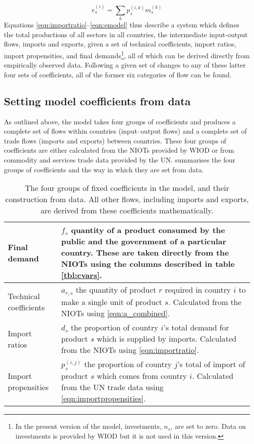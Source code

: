\documentclass[a4paper]{article}
\begin{document}
\begin{equation}\label{eqn:emodel}
e_s^{(i)} = \sum_k{p_s^{(i,k)}m_s^{(k)}}
\end{equation}
Equations \eqref{eqn:importratio}--\eqref{eqn:emodel} thus describe a system which defines the total productions of all sectors in all countries, the intermediate input-output flows, imports and exports, given a set of technical coefficients, import ratios, import propensities, and final demands\footnote{In the present version of the model, investments, $n_s$, are set to zero. 
Data on investments is provided by WIOD but it is not used in this version.}, all of which can be derived directly from empirically observed data.
Following a given set of changes to any of these latter four sets of coefficients, all of the former six categories of flow can be found.

\subsection{Setting model coefficients from data}
As outlined above, the model takes four groups of coefficients and produces a complete set of flows within countries (input--output flows) and a complete set of trade flows (imports and exports) between countries.
These four groups of coefficients are either calculated from the NIOTs provided by WIOD or from commodity and services trade data provided by the UN.
 summarises the four groups of coefficients and the way in which they are set from data.
\begin{table}
    \centering
    \caption{The four groups of fixed coefficients in the model, and their construction from data.
    All other flows, including imports and exports, are derived from these coefficients  mathematically.}
    \label{tbl:the_four_things}
    \begin{tabular}{lp{8cm}}
        \toprule
    Final demand &  $f_s$ quantity of a product consumed by the public and the government of a
    particular country.
    These are taken directly from the NIOTs using the columns described in table \ref{tbl:cvars}. \\
    \midrule
    Technical coefficients &  $a_{r,s}$ the quantity of product $r$ required in country $i$
    to make a single unit of product $s$. Calculated from the NIOTs using \cref{eqn:a_combined}. \\
    \midrule
    Import ratios &  $d_s$ the proportion of country $i$'s total demand for product $s$ which is
    supplied by imports. Calculated from the NIOTs using \cref{eqn:importratio}. \\
    \midrule
    Import propensities &  $p_s^{(i,j)}$ the proportion of country $j$'s total of import of
    product $s$ which comes from country $i$. Calculated from the UN trade data using
    \cref{eqn:importpropensities}.\\
    \bottomrule
    \end{tabular}
\end{table}
\end{document}
